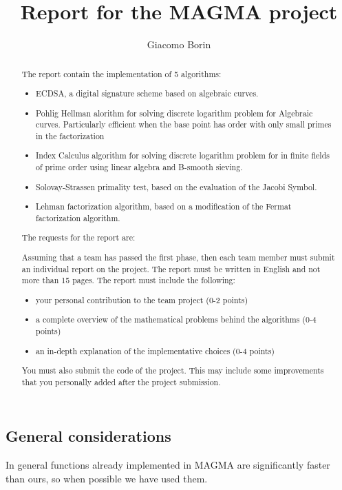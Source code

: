 \documentclass{article}
\title{Report for the MAGMA project}
\author{Giacomo Borin}
\theoremstyle{plain}
\theoremstyle{remark}
\theoremstyle{definition}
\begin{document}
\maketitle

\begin{abstract}
	The report contain the implementation of 5 algorithms:
	\begin{itemize}
		\item ECDSA, a digital signature scheme based on algebraic curves.
		\item Pohlig Hellman alorithm for solving discrete logarithm problem for Algebraic curves. Particularly efficient when the base point has order with only small primes in the factorization
		\item Index Calculus algorithm for solving discrete logarithm problem for in finite fields of prime order using linear algebra and B-smooth sieving.
		\item Solovay-Strassen primality test, based on the evaluation of the Jacobi Symbol.
		\item Lehman factorization algorithm, based on a modification of the Fermat factorization algorithm.
	\end{itemize}

	The requests for the report are:


	Assuming that a team has passed the first phase, then each team member must submit an individual report on the project. The report must be written in English and not more than 15 pages.
	The report must include the following:
	\begin{itemize}
		\item your personal contribution to the team project (0-2 points)
		\item a complete overview of the mathematical problems behind the algorithms (0-4
points)
		\item an in-depth explanation of the implementative choices (0-4 points)
	\end{itemize}
	You must also submit the code of the project. This may include some improvements that you personally added after the project submission.


\end{abstract}

\subsection*{General considerations}

In general functions already implemented in MAGMA are significantly faster than ours, so when possible we have used them. 
\end{document}
